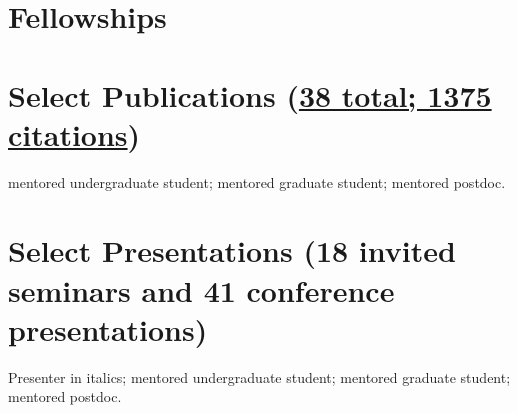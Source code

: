 \section*{Fellowships}


\section*{Select Publications (\href{https://scholar.google.com/citations?user=lz3wj6AAAAAJ&hl=en}{38 total; 1375 citations})}
\ugsymbol{}mentored undergraduate student;
\phdsymbol{}mentored graduate student;
\postdocsymbol{}mentored postdoc.

\nocite{*}
\printbibliography[filter=resumepapers, heading=none]

\section*{Select Presentations (18 invited seminars and 41 conference presentations)}
Presenter in italics;
\ugsymbol{}mentored undergraduate student;
\phdsymbol{}mentored graduate student;
\postdocsymbol{}mentored postdoc.

\nocite{*}
\printbibliography[filter=highlightedpresentations, heading=none]

